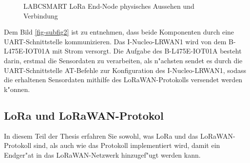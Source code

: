 \begin{figure}[h!]
	\centering
	\caption{LABCSMART LoRa End-Node physisches Aussehen 
	 und Verbindung 
	\label{fig:loranode}}
\end{figure}

Dem Bild \ref{fig-subfig2} ist zu entnehmen, dass beide Komponenten 
durch eine UART-Schnittstelle kommunizieren. Das I-Nucleo-LRWAN1 wird 
von dem  B-L475E-IOT01A mit Strom versorgt. Die Aufgabe des 
B-L475E-IOT01A besteht darin, erstmal die Sensordaten zu verarbeiten, 
als n"achsten sendet es durch die UART-Schnittstelle AT-Befehle zur 
Konfiguration des I-Nucleo-LRWAN1, sodass die erhaltenen Sensordaten 
mithilfe des LoRaWAN-Protokolls versendet werden k"onnen. 

\subsection{LoRa und LoRaWAN-Protokol}\label{LoRaWAN_P}

In diesem Teil der Thesis erfahren Sie sowohl, was LoRa und das 
LoRaWAN-Protokoll sind, als auch wie das Protokoll implementiert wird, 
damit ein Endger"at in das LoRaWAN-Netzwerk hinzugef"ugt werden kann.

